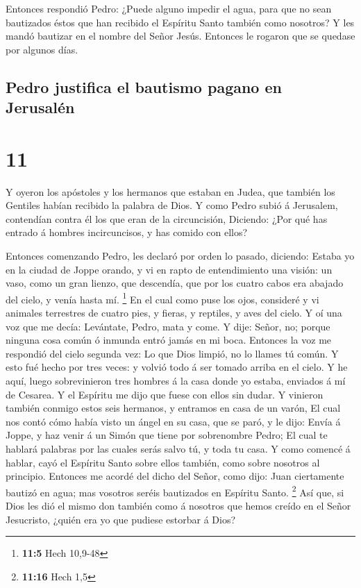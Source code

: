  Entonces respondió Pedro: ¿Puede alguno impedir el agua,
para que no sean bautizados éstos que han recibido el Espíritu Santo
también como nosotros?  Y les mandó bautizar en el nombre
del Señor Jesús. Entonces le rogaron que se quedase por algunos días.

\hypertarget{pedro-justifica-el-bautismo-pagano-en-jerusaluxe9n}{%
\subsection{Pedro justifica el bautismo pagano en
Jerusalén}\label{pedro-justifica-el-bautismo-pagano-en-jerusaluxe9n}}

\hypertarget{section-10}{%
\section{11}\label{section-10}}

 Y oyeron los apóstoles y los hermanos que estaban en Judea,
que también los Gentiles habían recibido la palabra de Dios.
 Y como Pedro subió á Jerusalem, contendían contra él los
que eran de la circuncisión,  Diciendo: ¿Por qué has entrado
á hombres incircuncisos, y has comido con ellos?

 Entonces comenzando Pedro, les declaró por orden lo pasado,
diciendo:  Estaba yo en la ciudad de Joppe orando, y vi en
rapto de entendimiento una visión: un vaso, como un gran lienzo, que
descendía, que por los cuatro cabos era abajado del cielo, y venía hasta
mí. \footnote{\textbf{11:5} Hech 10,9-48}  En el cual como
puse los ojos, consideré y vi animales terrestres de cuatro pies, y
fieras, y reptiles, y aves del cielo.  Y oí una voz que me
decía: Levántate, Pedro, mata y come.  Y dije: Señor, no;
porque ninguna cosa común ó inmunda entró jamás en mi boca. 
Entonces la voz me respondió del cielo segunda vez: Lo que Dios limpió,
no lo llames tú común.  Y esto fué hecho por tres veces: y
volvió todo á ser tomado arriba en el cielo.  Y he aquí,
luego sobrevinieron tres hombres á la casa donde yo estaba, enviados á
mí de Cesarea.  Y el Espíritu me dijo que fuese con ellos
sin dudar. Y vinieron también conmigo estos seis hermanos, y entramos en
casa de un varón,  El cual nos contó cómo había visto un
ángel en su casa, que se paró, y le dijo: Envía á Joppe, y haz venir á
un Simón que tiene por sobrenombre Pedro;  El cual te
hablará palabras por las cuales serás salvo tú, y toda tu casa.
 Y como comencé á hablar, cayó el Espíritu Santo sobre
ellos también, como sobre nosotros al principio.  Entonces
me acordé del dicho del Señor, como dijo: Juan ciertamente bautizó en
agua; mas vosotros seréis bautizados en Espíritu Santo. \footnote{\textbf{11:16}
  Hech 1,5}  Así que, si Dios les dió el mismo don también
como á nosotros que hemos creído en el Señor Jesucristo, ¿quién era yo
que pudiese estorbar á Dios?

